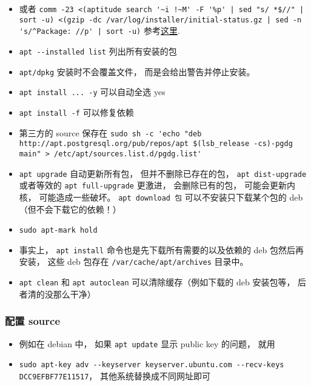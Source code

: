 \begin{itemize}
\item 或者 \verb`comm -23 <(aptitude search '~i !~M' -F '%p' | sed "s/ *$//" | sort -u) <(gzip -dc /var/log/installer/initial-status.gz | sed -n 's/^Package: //p' | sort -u)` 参考\href{https://askubuntu.com/questions/2389/how-to-list-manually-installed-packages}{这里}.
\item \verb`apt --installed list` 列出所有安装的包
\item \verb`apt/dpkg` 安装时不会覆盖文件， 而是会给出警告并停止安装。
\item \verb`apt install ... -y` 可以自动全选 yes
\item \verb`apt install -f` 可以修复依赖
\item 第三方的 source 保存在 \verb`sudo sh -c 'echo "deb http://apt.postgresql.org/pub/repos/apt $(lsb_release -cs)-pgdg main" > /etc/apt/sources.list.d/pgdg.list'`
\item \verb`apt upgrade` 自动更新所有包， 但并不删除已存在的包， \verb`apt dist-upgrade` 或者等效的 \verb`apt full-upgrade` 更激进， 会删除已有的包， 可能会更新内核， 可能造成一些破坏。
\verb`apt download 包` 可以不安装只下载某个包的 deb （但不会下载它的依赖！）
\item \verb`sudo apt-mark hold `
\item 事实上， \verb`apt install` 命令也是先下载所有需要的以及依赖的 deb 包然后再安装， 这些 deb 包存在 \verb`/var/cache/apt/archives` 目录中。
\item \verb`apt clean` 和 \verb`apt autoclean` 可以清除缓存（例如下载的 deb 安装包等， 后者清的没那么干净）
\end{itemize}


\subsubsection{配置 source}
\begin{itemize}
\item 例如在 debian 中， 如果 \verb`apt update` 显示 public key 的问题， 就用
\item \verb`sudo apt-key adv --keyserver keyserver.ubuntu.com --recv-keys DCC9EFBF77E11517`， 其他系统替换成不同网址即可
\end{itemize}

